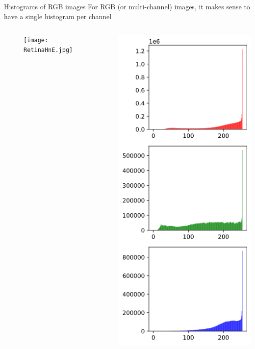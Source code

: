\documentclass[9pt, aspectratio=169]{beamer}
\begin{document}
\begin{frame}
    {Histograms of RGB images}
    For RGB (or multi-channel) images, it makes sense to have a single histogram per channel

    \begin{columns}
        \begin{column}{0.5\textwidth}
            \begin{figure}
                \texttt{[image: RetinaHnE.jpg]}
                \caption{\small{\color{gray}{H\&E staining of retina (cell nuclei stained blue-purple and extracellular material stained pink)\newline Librepath - CC BY-SA 3.0}}}
            \end{figure}
        \end{column}
        \begin{column}{0.5\textwidth}
            \includegraphics[height=.8\textheight]{RGBhisto.png}

\end{column}
\end{columns}
\end{frame}
\end{document}
